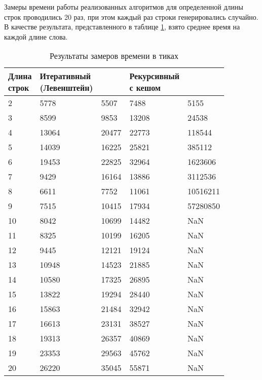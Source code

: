 Замеры времени работы реализованных алгоритмов для определенной длины строк проводились 20 раз, при этом каждый раз строки генерировались случайно. В качестве результата, представленного в таблице \ref{tab:time}, взято среднее время на каждой длине слова. 
\pagebreak
\begin{table}[h]
	\begin{center}
		\caption{\label{tab:time}Результаты замеров времени в тиках}
	\begin{tabular}{|l|l|l|l|l|}
		\hline \specialcell{Длина\\строк} & \specialcell{Итеративный\\(Левенштейн)} &
		 \specialcell{Итеративный} & \specialcell{Рекурсивный \\с кешом} & \specialcell{Рекурсивный} \\\hline
		2   & 5778   & 5507   & 7488    & 5155     \\\hline
		3   & 8599   & 9853   & 13208   & 24538    \\\hline
		4   & 13064  & 20477  & 22773   & 118544   \\\hline
		5   & 14039  & 16225  & 25821   & 385112   \\\hline
		6   & 19453  & 22825  & 32964   & 1623606  \\\hline
		7   & 9429   & 16164  & 13886   & 3112536  \\\hline
		8   & 6611   & 7752   & 11061   & 10516211 \\\hline
		9   & 7515   & 10415  & 17934   & 57280850 \\\hline
		10  & 8042   & 10699  & 14482   & NaN       \\\hline
		11  & 8325   & 10199  & 16205   & NaN        \\\hline
		12  & 9445   & 12121  & 19124   & NaN      \\\hline
		13  & 10948  & 14523  & 21885   & NaN        \\\hline
		14  & 10580  & 17325  & 26895   & NaN        \\\hline
		15  & 13822  & 19294  & 28440   & NaN        \\\hline
		16  & 15863  & 21484  & 32942   & NaN        \\\hline
		17  & 16613  & 23131  & 38527   & NaN        \\\hline
		18  & 19313  & 26357  & 40869   & NaN        \\\hline
		19  & 23353  & 29563  & 45762   & NaN        \\\hline
		20  & 26220  & 35045  & 55871   & NaN        \\\hline

\end{tabular}
\end{center}
\end{table}
